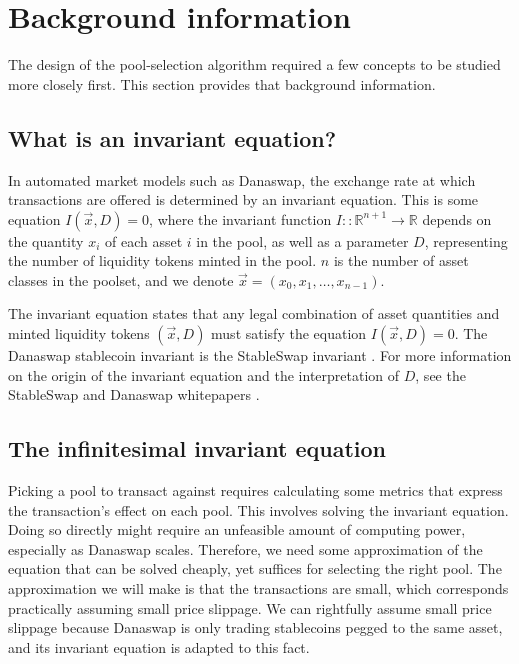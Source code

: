 \documentclass[12pt]{article}
\begin{document}
\section{Background information}

The design of the pool-selection algorithm required a few concepts to be studied
more closely first. This section provides that background information.

\subsection{What is an invariant equation?}

In automated market models such as Danaswap, the exchange rate at which
transactions are offered is determined by an invariant equation.
This is some equation $I(\vec{x}, D) = 0$, where the invariant function $I ::
\mathbb{R}^{n+1} \rightarrow \mathbb{R}$ depends on the quantity $x_i$ of each
asset $i$ in the pool, as well as a parameter $D$, representing the number of
liquidity tokens minted in the pool.
$n$ is the number of asset classes in the poolset, and we denote $\vec{x} =
(x_0, x_1, \ldots, x_{n-1})$.

The invariant equation states that any legal combination of asset quantities and
minted liquidity tokens $(\vec{x}, D)$ must satisfy the equation $I(\vec{x}, D)
= 0$.
The Danaswap stablecoin invariant is the StableSwap invariant \cite{stableswap}.
For more information on the origin of the invariant equation and the
interpretation of $D$, see the StableSwap and Danaswap whitepapers
\cite{stableswap, danaswap}.

\subsection{The infinitesimal invariant equation}

Picking a pool to transact against requires calculating some metrics
that express the transaction's effect on each pool.
This involves solving the invariant equation.
Doing so directly might require an unfeasible amount of computing power,
especially as Danaswap scales.
Therefore, we need some approximation of the equation that can be solved
cheaply, yet suffices for selecting the right pool.
The approximation we will make is that the transactions are small, which
corresponds practically assuming small price slippage.
We can rightfully assume small price slippage because Danaswap is only trading
stablecoins pegged to the same asset, and its invariant equation is adapted to
this fact.
\end{document}
